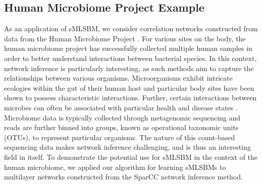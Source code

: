 {\subsection{Human Microbiome Project Example}
\indent As an application of sMLSBM, we consider correlation networks constructed from data from the Human Microbiome Project \cite{microbiome}. For various sites on the body, the human microbiome project has successfully collected multiple human samples in order to better understand interactions between bacterial species. In this context, network inference is particularly interesting, as such methods aim to capture the relationships between various organisms. Microorganisms exhibit intricate ecologies within the gut of their human host and particular body sites have been shown to possess characteristic interactions. Further, certain interactions between microbes can often be associated with particular health and disease states \cite{microbeco}. Microbiome data is typically collected through metagenomic sequencing and reads are further binned into groups, known as operational taxonomic units (OTUs), to represent particular organisms. The nature of this count-based sequencing data makes network inference challenging, and is thus an interesting field in itself. To demonstrate the potential use for sMLSBM in the context of the human microbiome, we applied our algorithm for learning sMLSBMs to multilayer networks constructed from the SparCC \cite{sparcc} network inference method. \\
}
